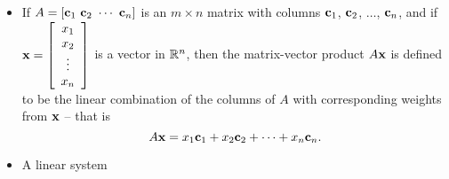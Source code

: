 
\begin{itemize}
\item If $A = [\vc_1 \ \vc_2 \ \cdots \ \vc_n]$ is an $m \times n$ matrix with columns $\mathbf{c}_1$, $\mathbf{c}_2$, $\ldots$, $\mathbf{c}_n$, and if $\mathbf{x} = \left[ \begin{array}{c} x_1\\x_2\\ \vdots \\ x_n \end{array} \right]$ is a vector in $\mathbb{R}^n$, then the matrix-vector product $A \mathbf{x}$ is defined to be the linear combination of the columns of $A$ with corresponding weights from $\mathbf{x}$ -- that is 
\[A \mathbf{x} = x_1 \mathbf{c}_1 + x_2 \mathbf{c}_2 + \cdots + x_n \mathbf{c}_n.\]
\item A linear system


\end{itemize}
